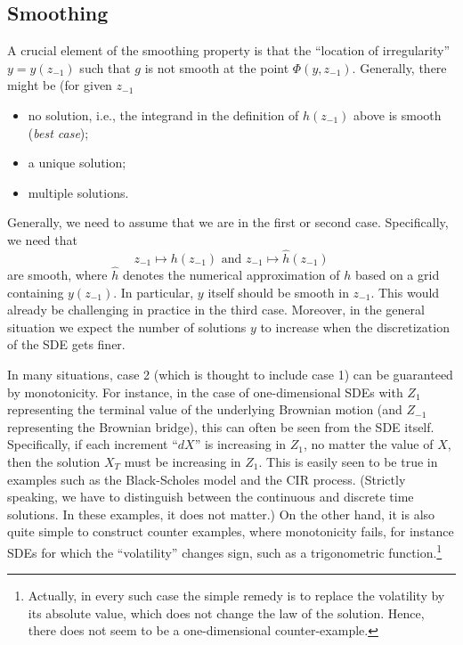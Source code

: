 \documentclass[11pt]{article}
\begin{document}
\subsection{Smoothing}
\label{sec:smoothing}

A crucial element of the smoothing property is that the ``location of
irregularity'' $y = y(z_{-1})$ such that $g$ is not smooth at the point
$\Phi(y, z_{-1})$. Generally, there might be (for given $z_{-1}$
\begin{itemize}
\item no solution, i.e., the integrand in the definition of $h(z_{-1})$ above
  is smooth (\textit{best case});
\item a unique solution;
\item multiple solutions.
\end{itemize}
Generally, we need to assume that we are in the first or second
case. Specifically, we need that
\begin{equation*}
   z_{-1} \mapsto h(z_{-1}) \text{ and } z_{-1} \mapsto \hat{h}(z_{-1})
\end{equation*}
are smooth, where $\hat{h}$ denotes the numerical approximation of $h$ based
on a grid containing $y(z_{-1})$. In particular, $y$ itself should be smooth
in $z_{-1}$. This would already be challenging in practice in the third
case. Moreover, in the general situation we expect the number of solutions $y$
to increase when the discretization of the SDE gets finer. 

In many situations, case 2 (which is thought to include case 1) can be
guaranteed by monotonicity. For instance, in the case of one-dimensional SDEs
with $Z_1$ representing the terminal value of the underlying Brownian motion
(and $Z_{-1}$ representing the Brownian bridge), this can often be seen from
the SDE itself. Specifically, if each increment ``$dX$'' is increasing in
$Z_1$, no matter the value of $X$, then the solution $X_T$ must be increasing
in $Z_1$. This is easily seen to be true in examples such as the Black-Scholes
model and the CIR process. (Strictly speaking, we have to distinguish between
the continuous and discrete time solutions. In these examples, it does not
matter.) On the other hand, it is also quite simple to construct counter
examples, where monotonicity fails, for instance SDEs for which the
``volatility'' changes sign, such as a trigonometric
function.\footnote{Actually, in every such case the simple remedy is to
  replace the volatility by its absolute value, which does not change the law
  of the solution. Hence, there does not seem to be a one-dimensional
  counter-example.}
\end{document}
